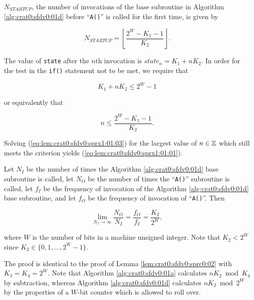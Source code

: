 \begin{vworklemmastatement}
\label{lem:crat0:sfdv0:sprx1:01}
$N_{STARTUP}$, the number of invocations of the base subroutine
in Algorithm \ref{alg:crat0:sfdv0:01d} before ``\texttt{A()}'' is called
for the first time, is given by

\begin{equation}
\label{eq:lem:crat0:sfdv0:sprx1:01:01}
N_{STARTUP} = 
\left\lfloor
{
\frac{2^W - K_1 - 1}{K_2}
}
\right\rfloor .
\end{equation} 
\end{vworklemmastatement}
\begin{vworklemmaproof}
The value of \texttt{state} after the $n$th invocation
is $state_n = K_1 + n K_2$.  In order for the test in the 
\texttt{if()} statement not to be met, we require that

\begin{equation}
\label{eq:lem:crat0:sfdv0:sprx1:01:02}
K_1 + n K_2 \leq 2^W - 1
\end{equation} 

\noindent{}or equivalently that

\begin{equation}
\label{eq:lem:crat0:sfdv0:sprx1:01:03}
n \leq \frac{2^W - K_1 - 1}{K_2} .
\end{equation} 

Solving (\ref{eq:lem:crat0:sfdv0:sprx1:01:03}) for the largest
value of $n \in {\mathbb{Z}}$ which still meets the criterion
yields (\ref{eq:lem:crat0:sfdv0:sprx1:01:01}).
\end{vworklemmaproof}

\begin{vworklemmastatement}
\label{lem:crat0:sfdv0:sprx1:02}
Let $N_I$ be the number of times the Algorithm \ref{alg:crat0:sfdv0:01d} base subroutine
is called, let $N_O$ be the number of times the 
``\texttt{A()}'' subroutine is called, let
$f_I$ be the frequency of invocation of the 
Algorithm \ref{alg:crat0:sfdv0:01d} base subroutine, and let 
$f_O$ be the frequency of invocation of 
``\texttt{A()}''.  Then

\begin{equation}
\label{eq:lem:crat0:sfdv0:sprx1:02:01}
\lim_{N_I\rightarrow\infty}\frac{N_O}{N_I}
=
\frac{f_O}{f_I}
=
\frac{K_2}{2^W} , 
\end{equation} 

where $W$ is the number of bits in a machine unsigned integer.
Note that $K_2 < 2^W$ since $K_2 \in \{ 0, 1, \ldots , 2^W-1 \}$.
\end{vworklemmastatement}
\begin{vworklemmaproof}
The proof is identical to the proof of
Lemma \ref{lem:crat0:sfdv0:sprc0:02} with $K_3=K_4=2^W$.
Note that Algorithm \ref{alg:crat0:sfdv0:01a} calculates $n K_2 \bmod K_4$ by
subtraction, whereas Algorithm \ref{alg:crat0:sfdv0:01d} calculates
$n K_2 \bmod 2^W$ by the properties of a $W$-bit counter
which is allowed to roll over.
\end{vworklemmaproof}


